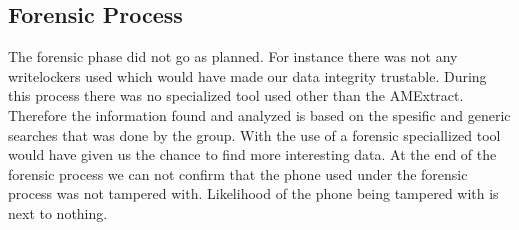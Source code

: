 \subsection{Forensic Process}
The forensic phase did not go as planned. For instance there was not any writelockers used which would have made our data integrity trustable. During this process there was no specialized tool used other than the AMExtract. Therefore the information found and analyzed is based on the spesific and generic searches that was done by the group. With the use of a forensic speciallized tool would have given us the chance to find more interesting data. At the end of the forensic process we can not confirm that the phone used under the forensic process was not tampered with. Likelihood of the phone being tampered with is next to nothing.